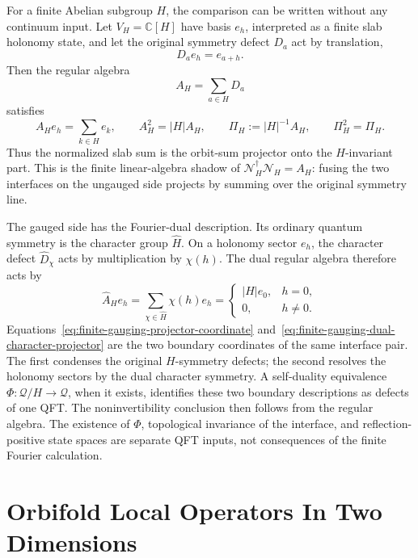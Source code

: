 For a finite Abelian subgroup \(H\), the comparison can be written without any
continuum input.  Let \(V_H=\mathbb C[H]\) have basis \(e_h\), interpreted as a
finite slab holonomy state, and let the original symmetry defect \(D_a\) act by
translation,
\[
  D_a e_h=e_{a+h}.
\]
Then the regular algebra
\[
  A_H=\sum_{a\in H}D_a
\]
satisfies
\begin{equation}
  A_H e_h=\sum_{k\in H}e_k,\qquad
  A_H^2=|H|A_H,\qquad
  \Pi_H:=|H|^{-1}A_H,\qquad
  \Pi_H^2=\Pi_H .
  \label{eq:finite-gauging-projector-coordinate}
\end{equation}
Thus the normalized slab sum is the orbit-sum projector onto the \(H\)-invariant
part.  This is the finite linear-algebra shadow of
\(\mathcal N_H^\dagger\mathcal N_H=A_H\): fusing the two interfaces on the
ungauged side projects by summing over the original symmetry line.

The gauged side has the Fourier-dual description.  Its ordinary quantum
symmetry is the character group \(\widehat H\).  On a holonomy sector \(e_h\),
the character defect \(\widehat D_\chi\) acts by multiplication by \(\chi(h)\).
The dual regular algebra therefore acts by
\begin{equation}
  \widehat A_H e_h
  =
  \sum_{\chi\in\widehat H}\chi(h)e_h
  =
  \begin{cases}
    |H|e_0,& h=0,\\
    0,& h\ne 0 .
  \end{cases}
  \label{eq:finite-gauging-dual-character-projector}
\end{equation}
Equations~\eqref{eq:finite-gauging-projector-coordinate}
and~\eqref{eq:finite-gauging-dual-character-projector} are the two boundary
coordinates of the same interface pair.  The first condenses the original
\(H\)-symmetry defects; the second resolves the holonomy sectors by the dual
character symmetry.  A self-duality equivalence
\(\Phi:\mathcal Q/H\to\mathcal Q\), when it exists, identifies these two
boundary descriptions as defects of one QFT.  The noninvertibility conclusion
then follows from the regular algebra.  The existence of \(\Phi\), topological
invariance of the interface, and reflection-positive state spaces are separate
QFT inputs, not consequences of the finite Fourier calculation.

\section{Orbifold Local Operators In Two Dimensions}

